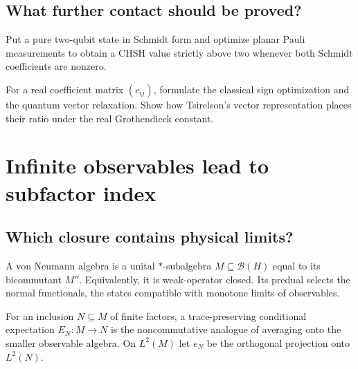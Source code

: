 \section{What further contact should be proved?}

\begin{exercise}
Put a pure two-qubit state in Schmidt form and optimize planar Pauli
measurements to obtain a CHSH value strictly above two whenever both Schmidt
coefficients are nonzero.
\end{exercise}

\begin{exercise}
For a real coefficient matrix $(c_{ij})$, formulate the classical sign
optimization and the quantum vector relaxation.  Show how Tsirelson's vector
representation places their ratio under the real Grothendieck constant.
\end{exercise}


\chapter{Infinite observables lead to subfactor index}
\label{ch:subfactors}



\section{Which closure contains physical limits?}

A von Neumann algebra is a unital $*$-subalgebra
$M\subseteq\mathcal B(H)$ equal to its bicommutant $M''$.  Equivalently, it
is weak-operator closed.  Its predual selects the normal functionals, the
states compatible with monotone limits of observables.

For an inclusion $N\subseteq M$ of finite factors, a trace-preserving
conditional expectation $E_N:M\to N$ is the noncommutative analogue of
averaging onto the smaller observable algebra.  On $L^2(M)$ let $e_N$ be the
orthogonal projection onto $L^2(N)$.

